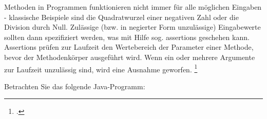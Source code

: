\documentclass{bschlangaul-aufgabe}
\begin{document}

Methoden in Programmen funktionieren nicht immer für alle möglichen
Eingaben - klassische Beispiele sind die Quadratwurzel einer negativen
Zahl oder die Division durch Null. Zulässige (bzw. in negierter Form
unzulässige) Eingabewerte sollten dann spezifiziert werden, was mit
Hilfe sog. assertions geschehen kann. Assertions prüfen zur Laufzeit den
Wertebereich der Parameter einer Methode, bevor der Methodenkörper
ausgeführt wird. Wenn ein oder mehrere Argumente zur Laufzeit unzulässig
sind, wird eine Ausnahme geworfen.
\footcite{examen:66116:2019:09}

\bigskip

\noindent
Betrachten Sie das folgende Java-Programm:

\end{document}
